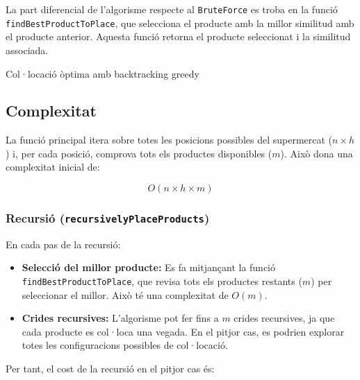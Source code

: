 \documentclass[a4paper,12pt]{report}
\begin{document}
\begin{itemize}
La part diferencial de l'algorisme respecte al \texttt{BruteForce} es troba en la funció \texttt{findBestProductToPlace}, que selecciona el producte amb la millor similitud amb el producte anterior. 
Aquesta funció retorna el producte seleccionat i la similitud associada.
\newline
\begin{algorithm}[H]
	\SetAlgoVlined
	\caption{Col·locació òptima amb backtracking greedy}
\end{algorithm}

\subsection{Complexitat}

La funció principal itera sobre totes les posicions possibles del supermercat (\(n \times h\)) i, per cada posició, comprova tots els productes disponibles (\(m\)). Això dona una complexitat inicial de:

\[
O(n \times h \times m)
\]

\subsubsection{Recursió (\texttt{recursivelyPlaceProducts})}

En cada pas de la recursió:
\begin{itemize}
    \item \textbf{Selecció del millor producte:} Es fa mitjançant la funció \texttt{findBestProductToPlace}, que revisa tots els productes restants (\(m\)) per seleccionar el millor. Això té una complexitat de \(O(m)\).
    \item \textbf{Crides recursives:} L'algorisme pot fer fins a \(m\) crides recursives, ja que cada producte es col·loca una vegada. En el pitjor cas, es podrien explorar totes les configuracions possibles de col·locació.
\end{itemize}

Per tant, el cost de la recursió en el pitjor cas és:


\end{itemize}
\end{document}

